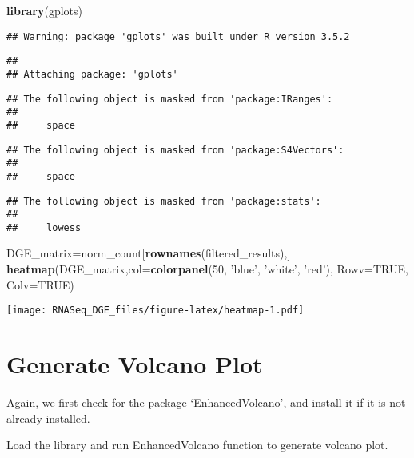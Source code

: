 \documentclass[]{article}
\newenvironment{Shaded}{\begin{snugshade}}{\end{snugshade}}
\newcommand{\KeywordTok}[1]{\textcolor[rgb]{0.13,0.29,0.53}{\textbf{#1}}}
\newcommand{\DataTypeTok}[1]{\textcolor[rgb]{0.13,0.29,0.53}{#1}}
\newcommand{\DecValTok}[1]{\textcolor[rgb]{0.00,0.00,0.81}{#1}}
\newcommand{\StringTok}[1]{\textcolor[rgb]{0.31,0.60,0.02}{#1}}
\newcommand{\OtherTok}[1]{\textcolor[rgb]{0.56,0.35,0.01}{#1}}
\newcommand{\NormalTok}[1]{#1}
\begin{document}
\begin{Shaded}
\begin{Highlighting}[]
\KeywordTok{library}\NormalTok{(gplots)}
\end{Highlighting}
\end{Shaded}

\begin{verbatim}
## Warning: package 'gplots' was built under R version 3.5.2
\end{verbatim}

\begin{verbatim}
## 
## Attaching package: 'gplots'
\end{verbatim}

\begin{verbatim}
## The following object is masked from 'package:IRanges':
## 
##     space
\end{verbatim}

\begin{verbatim}
## The following object is masked from 'package:S4Vectors':
## 
##     space
\end{verbatim}

\begin{verbatim}
## The following object is masked from 'package:stats':
## 
##     lowess
\end{verbatim}

\begin{Shaded}
\begin{Highlighting}[]
\NormalTok{DGE_matrix=norm_count[}\KeywordTok{rownames}\NormalTok{(filtered_results),]}
\KeywordTok{heatmap}\NormalTok{(DGE_matrix,}\DataTypeTok{col=}\KeywordTok{colorpanel}\NormalTok{(}\DecValTok{50}\NormalTok{, }\StringTok{'blue'}\NormalTok{, }\StringTok{'white'}\NormalTok{, }\StringTok{'red'}\NormalTok{),}
        \DataTypeTok{Rowv=}\OtherTok{TRUE}\NormalTok{, }\DataTypeTok{Colv=}\OtherTok{TRUE}\NormalTok{)}
\end{Highlighting}
\end{Shaded}

\texttt{[image: RNASeq\_DGE\_files/figure-latex/heatmap-1.pdf]}

\section{Generate Volcano Plot}\label{generate-volcano-plot}

Again, we first check for the package `EnhancedVolcano', and install it
if it is not already installed.

Load the library and run EnhancedVolcano function to generate volcano
plot.
\end{document}
